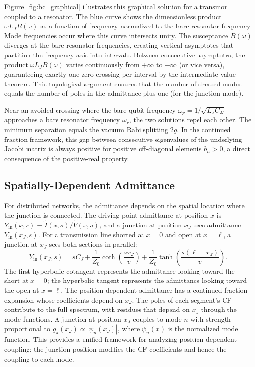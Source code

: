 \documentclass[reprint, floatfix, superscriptaddress, amsmath, amssymb, longbibliography]{revtex4-2}
\begin{document}
Figure~\ref{fig:bc_graphical} illustrates this graphical solution for a transmon coupled to a resonator. The blue curve shows the dimensionless product $\omega L_J B(\omega)$ as a function of frequency normalized to the bare resonator frequency. Mode frequencies occur where this curve intersects unity. The susceptance $B(\omega)$ diverges at the bare resonator frequencies, creating vertical asymptotes that partition the frequency axis into intervals. Between consecutive asymptotes, the product $\omega L_J B(\omega)$ varies continuously from $+\infty$ to $-\infty$ (or vice versa), guaranteeing exactly one zero crossing per interval by the intermediate value theorem. This topological argument ensures that the number of dressed modes equals the number of poles in the admittance plus one (for the junction mode).

Near an avoided crossing where the bare qubit frequency $\omega_p = 1/\sqrt{L_J C_\Sigma}$ approaches a bare resonator frequency $\omega_r$, the two solutions repel each other. The minimum separation equals the vacuum Rabi splitting $2g$. In the continued fraction framework, this gap between consecutive eigenvalues of the underlying Jacobi matrix is always positive for positive off-diagonal elements $b_n > 0$, a direct consequence of the positive-real property.



\subsection{Spatially-Dependent Admittance}
\label{sec:spatial_admittance}

For distributed networks, the admittance depends on the spatial location where the junction is connected. The driving-point admittance at position $x$ is $Y_{\mathrm{in}}(x,s) = \tilde{I}(x,s)/\tilde{V}(x,s)$, and a junction at position $x_J$ sees admittance $Y_{\mathrm{in}}(x_J,s)$. For a transmission line shorted at $x = 0$ and open at $x = \ell$, a junction at $x_J$ sees both sections in parallel:
\begin{equation}
Y_{\mathrm{in}}(x_J,s) = sC_J + \frac{1}{Z_0}\coth\left(\frac{sx_J}{v}\right) + \frac{1}{Z_0}\tanh\left(\frac{s(\ell-x_J)}{v}\right).
\label{eq:Yin_tline_explicit}
\end{equation}
The first hyperbolic cotangent represents the admittance looking toward the short at $x=0$; the hyperbolic tangent represents the admittance looking toward the open at $x=\ell$. The position-dependent admittance has a continued fraction expansion whose coefficients depend on $x_J$. The poles of each segment's CF contribute to the full spectrum, with residues that depend on $x_J$ through the mode functions. A junction at position $x_J$ couples to mode $n$ with strength proportional to $g_n(x_J) \propto |\psi_n(x_J)|$, where $\psi_n(x)$ is the normalized mode function. This provides a unified framework for analyzing position-dependent coupling: the junction position modifies the CF coefficients and hence the coupling to each mode.
\end{document}

